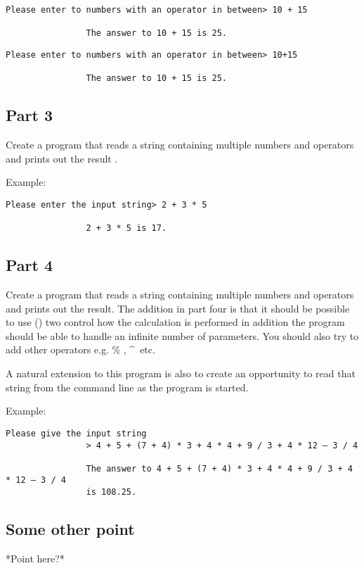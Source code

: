 \documentclass{article}
\begin{document}
			\begin{lstlisting}[numbers=none]
				Please enter to numbers with an operator in between> 10 + 15
				
				The answer to 10 + 15 is 25.
			\end{lstlisting}

			

			\begin{lstlisting}[numbers=none]
				Please enter to numbers with an operator in between> 10+15
				
				The answer to 10 + 15 is 25.
			\end{lstlisting}
			
		\subsection{Part 3}
			Create a program that reads a string containing multiple numbers and operators and prints out the result .
			
			Example:
			\begin{lstlisting}[numbers=none]
				Please enter the input string> 2 + 3 * 5
				
				2 + 3 * 5 is 17.
			\end{lstlisting}
		\subsection{Part 4}
			Create a program that reads a string containing multiple numbers and operators and prints out the result. The addition in part four is that it should be possible to use () two control how the calculation is performed in addition the program should be able to handle an infinite number of parameters. You should also try to add other operators e.g.  \% , \^~etc. \cite{UML2}
			
			A natural extension to this program is also to create an opportunity to read that string from the command line as the program is started. ~\cite{cpplang4}
			
			Example:
			\begin{lstlisting}[numbers=none]
				Please give the input string
				> 4 + 5 + (7 + 4) * 3 + 4 * 4 + 9 / 3 + 4 * 12 – 3 / 4
				
				The answer to 4 + 5 + (7 + 4) * 3 + 4 * 4 + 9 / 3 + 4 * 12 – 3 / 4
				is 108.25.
			\end{lstlisting}
		\subsection{Some other point}
			*Point here?*
	\\ \\
	
\end{document}
